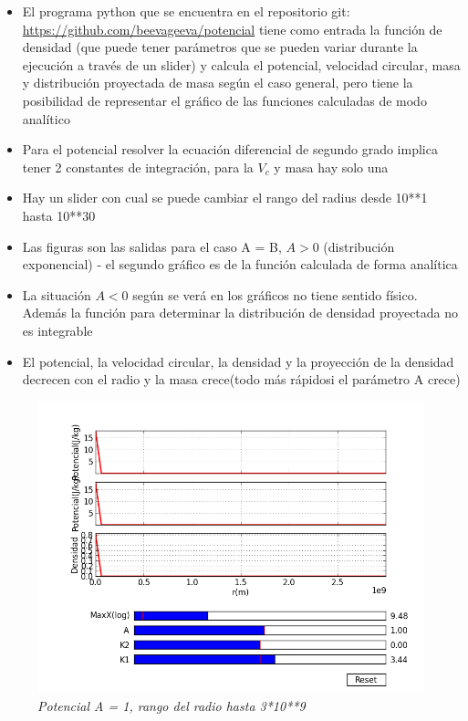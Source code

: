 \documentclass[12pt]{book}
\begin{document}
\begin{itemize}
	\item El programa python que se encuentra en el repositorio git: \url{https://github.com/beevageeva/potencial} tiene como entrada la función de densidad (que puede tener parámetros que se pueden variar durante la ejecución a través de un slider) y calcula el potencial, velocidad circular, masa y distribución proyectada de masa según el caso general, pero tiene la posibilidad de representar el gráfico de las funciones calculadas de modo analítico
\item Para el potencial resolver la ecuación diferencial de segundo grado implica tener 2 constantes de integración, para la $V_c$ y masa hay solo una
\item Hay un slider con cual se puede cambiar el rango del radius desde 10**1 hasta 10**30
\item Las figuras son las salidas para el caso A = B, $ A > 0 $ (distribución exponencial) - el segundo gráfico es de la función calculada de forma analítica
\item La situación $ A < 0 $ según se verá en los gráficos no tiene sentido físico. Además la función para determinar la distribución de densidad proyectada no es integrable
\item El potencial, la velocidad circular, la densidad y la proyección de la densidad  decrecen con el radio y la masa crece(todo más rápidosi el parámetro A crece)
\end{itemize}


\begin{figure}[!h]
 \centering
 \includegraphics[scale=0.7]{potencial1.png}
 \caption{\emph{Potencial A = 1, rango del radio hasta 3*10**9}}
 \label{Fig: 1}
\end{figure}
\end{document}
